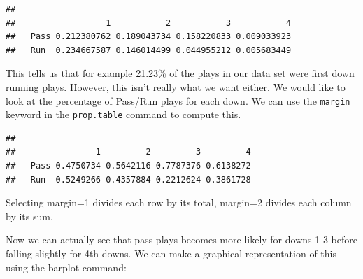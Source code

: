 \documentclass[
]{book}
\newenvironment{Shaded}{\begin{snugshade}}{\end{snugshade}}
\newcommand{\AttributeTok}[1]{\textcolor[rgb]{0.77,0.63,0.00}{#1}}
\newcommand{\DecValTok}[1]{\textcolor[rgb]{0.00,0.00,0.81}{#1}}
\newcommand{\FunctionTok}[1]{\textcolor[rgb]{0.00,0.00,0.00}{#1}}
\newcommand{\NormalTok}[1]{#1}
\newcommand{\OtherTok}[1]{\textcolor[rgb]{0.56,0.35,0.01}{#1}}
\newcommand{\SpecialCharTok}[1]{\textcolor[rgb]{0.00,0.00,0.00}{#1}}
\theoremstyle{definition}
\theoremstyle{definition}
\theoremstyle{definition}
\theoremstyle{definition}
\theoremstyle{remark}
\begin{document}
\begin{Shaded}
\end{Shaded}

\begin{verbatim}
##       
##                  1           2           3           4
##   Pass 0.212380762 0.189043734 0.158220833 0.009033923
##   Run  0.234667587 0.146014499 0.044955212 0.005683449
\end{verbatim}

This tells us that for example 21.23\% of the plays in our data set were first down running plays. However, this isn't really what we want either. We would like to look at the percentage of Pass/Run plays for each down. We can use the \texttt{margin} keyword in the \texttt{prop.table} command to compute this.

\begin{Shaded}
\end{Shaded}

\begin{verbatim}
##       
##                1         2         3         4
##   Pass 0.4750734 0.5642116 0.7787376 0.6138272
##   Run  0.5249266 0.4357884 0.2212624 0.3861728
\end{verbatim}

Selecting margin=1 divides each row by its total, margin=2 divides each column by its sum.

Now we can actually see that pass plays becomes more likely for downs 1-3 before falling slightly for 4th downs. We can make a graphical representation of this using the barplot command:

\begin{Shaded}
\end{Shaded}
\end{document}
